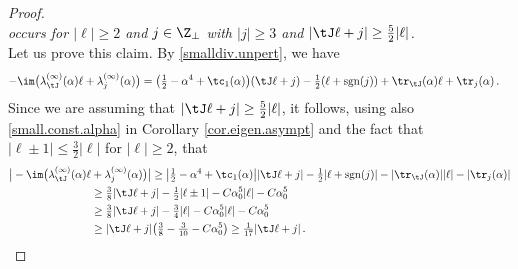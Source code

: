 \documentclass[a4paper,reqno,10pt]{article}
\begin{document}
\begin{proof}
\begin{equation}
   	\end{equation}
   	{\it occurs for $|\ell |\geq 2$ and $j\in \Z_{\perp}$ with $|j|\geq3$ and $|\tJ \ell + j|\geq 	\tfrac52 |\ell|$.}
    \\[1mm]
   	Let us prove this claim.
   		By \eqref{smalldiv.unpert}, we have
   		\begin{align}
   			-\im\big(  \lambda_{\tJ}^{(\infty)}(\alpha) \ell & + \lambda_{j}^{(\infty)} (\alpha) \big)   = \big( \tfrac12 - \alpha^4 +\tc_{1}(\alpha)  \big)(\tJ \ell +j) - \tfrac12(\ell +{\rm sgn}(j)) + \tr_{\tJ}(\alpha)\ell + \tr_{j}(\alpha)\,.
   		\end{align}
   		Since we are assuming that $|\tJ \ell + j| \geq \tfrac{5}{2}|\ell|$, it follows, using also \eqref{small.const.alpha} in Corollary \ref{cor.eigen.asympt} and the fact that $|\ell\pm1|\leq \tfrac32 |\ell|$ for $|\ell|\geq 2$, that
        \begin{equation}
   			\begin{aligned}
   				\big|  	-\im\big(  \lambda_{\tJ}^{(\infty)}(\alpha) \ell & + \lambda_{j}^{(\infty)} (\alpha) \big)   \big| \geq  \big|\tfrac12 -\alpha^4 + \tc_{1}(\alpha) \big| |\tJ\ell + j| -  \tfrac12 |\ell+{\rm sgn}(j)|- |\tr_{\tJ}(\alpha)| |\ell| - |\tr_{j}(\alpha)| \\
   				& \geq  \tfrac{3}{8} |\tJ\ell + j| - \tfrac12 |\ell \pm 1| - C \alpha_{0}^5 |\ell| - C \alpha_{0}^5 \\
   				& \geq \tfrac{3}{8} |\tJ\ell + j| - \tfrac34 |\ell | - C \alpha_{0}^5 |\ell| - C \alpha_{0}^5 \\
   				& \geq |\tJ\ell + j|\big(\tfrac38-\tfrac{3}{10}-C\alpha_0^5  \big)\geq\tfrac{1}{17}|\tJ\ell + j|\,.
   			\end{aligned}
   		\end{equation}

\end{proof}
\end{document}
